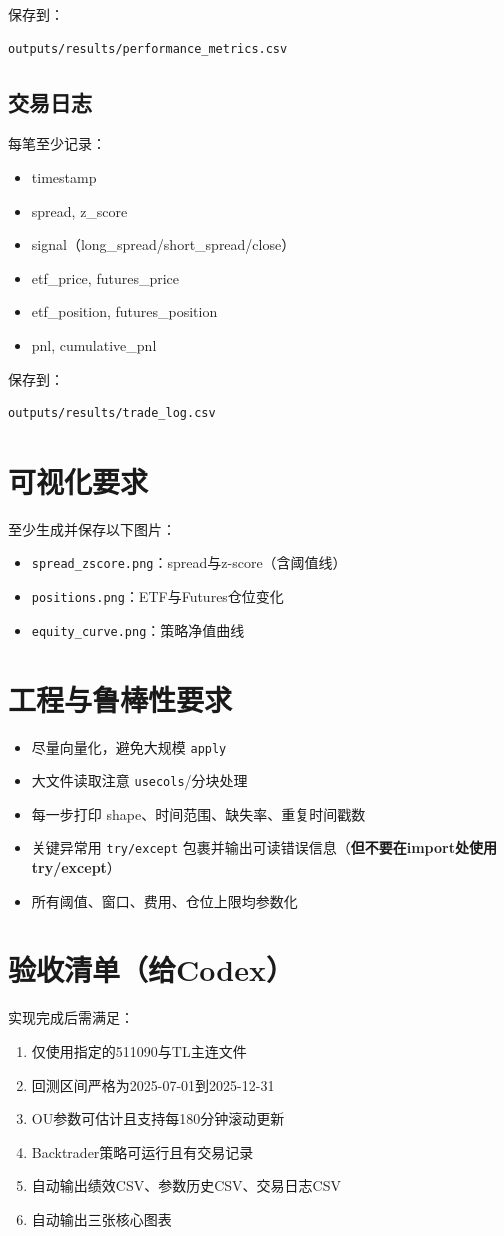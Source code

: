 \documentclass[11pt]{article}
\begin{document}
保存到：
\begin{lstlisting}
outputs/results/performance_metrics.csv
\end{lstlisting}

\subsection{交易日志}
每笔至少记录：
\begin{itemize}
  \item timestamp
  \item spread, z\_score
  \item signal（long\_spread/short\_spread/close）
  \item etf\_price, futures\_price
  \item etf\_position, futures\_position
  \item pnl, cumulative\_pnl
\end{itemize}

保存到：
\begin{lstlisting}
outputs/results/trade_log.csv
\end{lstlisting}

\section{可视化要求}
至少生成并保存以下图片：
\begin{itemize}
  \item \texttt{spread\_zscore.png}：spread与z-score（含阈值线）
  \item \texttt{positions.png}：ETF与Futures仓位变化
  \item \texttt{equity\_curve.png}：策略净值曲线
\end{itemize}

\section{工程与鲁棒性要求}
\begin{itemize}
  \item 尽量向量化，避免大规模 \texttt{apply}
  \item 大文件读取注意 \texttt{usecols}/分块处理
  \item 每一步打印 shape、时间范围、缺失率、重复时间戳数
  \item 关键异常用 \texttt{try/except} 包裹并输出可读错误信息（\textbf{但不要在import处使用try/except}）
  \item 所有阈值、窗口、费用、仓位上限均参数化
\end{itemize}

\section{验收清单（给Codex）}
实现完成后需满足：
\begin{enumerate}
  \item 仅使用指定的511090与TL主连文件
  \item 回测区间严格为2025-07-01到2025-12-31
  \item OU参数可估计且支持每180分钟滚动更新
  \item Backtrader策略可运行且有交易记录
  \item 自动输出绩效CSV、参数历史CSV、交易日志CSV
  \item 自动输出三张核心图表
\end{enumerate}
\end{document}
